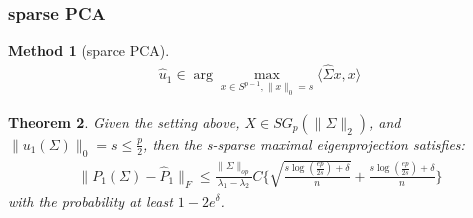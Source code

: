 \documentclass[a4paper,12pt, oneside, fleqn]{book}
\newtheorem{theorem}{Theorem}[section]
\newtheorem{method}[theorem]{Method}
\theoremstyle{definition}
\theoremstyle{remark}
\begin{document}
\subsubsection*{sparse PCA}

\begin{method}[sparce PCA]
\begin{align*}
	\hat{u}_1 \in  \arg\max_{x \in S^{p-1}, \|x\|_0 = s} \langle \hat{\Sigma}x, x\rangle
\end{align*}
\end{method}

\begin{theorem}
	Given the setting above, $X \in SG_p(\|\Sigma\|_2)$, and $\|u_1(\Sigma)\|_0 = s \le \frac{p}{2}$, then the s-sparse maximal eigenprojection satisfies:
	\begin{align*}
		\|P_1(\Sigma) - \hat{P}_1\|_F \le \frac{\|\Sigma\|_{op}}{\lambda_1 - \lambda_2} C\bigg\{\sqrt{\frac{s\log(\frac{ep}{2s})+ \delta}{n}} + \frac{s\log(\frac{ep}{2s})+\delta}{n}\bigg\}
	\end{align*}
	with the probability at least $1 - 2e^\delta$.
\end{theorem}
\end{document}
